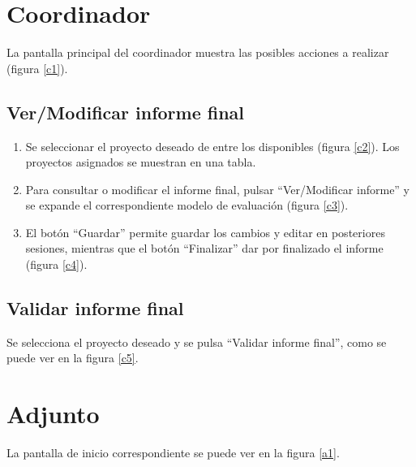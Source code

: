 \documentclass[12pt,a4paper,titlepage,spanish,twoside]{book}
\begin{document}
\section{Coordinador}
La pantalla principal del coordinador muestra las posibles acciones a realizar 
(figura \ref{c1}).

\subsection{Ver/Modificar informe final}
\begin{enumerate}
\item Se seleccionar el proyecto deseado de entre los disponibles (figura 
  \ref{c2}). Los proyectos asignados se muestran en una tabla.
  

\item Para consultar o modificar el informe final, pulsar 
  ``Ver/Modificar informe'' y se expande el correspondiente modelo de 
  evaluación (figura \ref{c3}).


\item El botón ``Guardar'' permite guardar los cambios y editar en 
  posteriores sesiones, mientras que el botón ``Finalizar'' dar por finalizado 
  el informe (figura \ref{c4}).
  
\end{enumerate}

\subsection{Validar informe final}
Se selecciona el proyecto deseado y se pulsa ``Validar informe final'', como se 
puede ver en la figura \ref{c5}.

\section{Adjunto}
La pantalla de inicio correspondiente se puede ver en la figura \ref{a1}.
\end{document}
